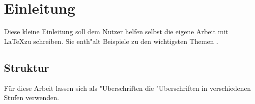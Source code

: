 \chapter{Einleitung}

Diese kleine Einleitung soll dem Nutzer helfen selbst die eigene Arbeit mit \LaTeX zu schreiben. Sie enth"alt Beispiele zu den wichtigsten Themen .


\section{Struktur}

Für diese Arbeit lassen sich als "Uberschriften die "Uberschriften in verschiedenen Stufen verwenden.


